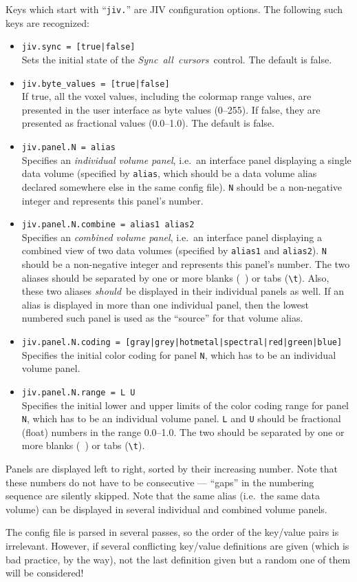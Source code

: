 Keys which start with ``\verb+jiv.+'' are JIV configuration
options. The following such keys are recognized:
\begin{itemize}
\item \verb+jiv.sync = [true|false]+ \\
  Sets the initial state of the \mbox{\em Sync all cursors}\ control.
  The default is false.
\item \verb+jiv.byte_values = [true|false]+ \\
  If true, all the voxel values, including the colormap range values,
  are presented in the user interface as byte values (0--255). If
  false, they are presented as fractional values (0.0--1.0). The
  default is false.
\item \verb+jiv.panel.N = alias+ \\
  Specifies an {\em individual volume panel}, i.e.\ an interface panel
  displaying a single data volume (specified by \verb+alias+, which
  should be a data volume alias declared somewhere else in the same
  config file).  \verb+N+ should be a non-negative integer and
  represents this panel's number.
\item \verb+jiv.panel.N.combine = alias1 alias2+ \\
  Specifies an {\em combined volume panel}, i.e.\ an interface panel
  displaying a combined view of two data volumes (specified by
  \verb+alias1+ and \verb+alias2+). \verb+N+ should be a non-negative
  integer and represents this panel's number. The two aliases should
  be separated by one or more blanks (\verb*+ +) or tabs (\verb+\t+).
  Also, these two aliases {\em should}\ be displayed in their
  individual panels as well. If an alias is displayed in more than one
  individual panel, then the lowest numbered such panel is used as the
  ``source'' for that volume alias.
\item \verb+jiv.panel.N.coding = [gray|grey|hotmetal|spectral|red|green|blue]+ \\
  Specifies the initial color coding for panel \verb+N+, which has to
  be an individual volume panel.
\item \verb+jiv.panel.N.range = L U+ \\
  Specifies the initial lower and upper limits of the color coding
  range for panel \verb+N+, which has to be an individual volume
  panel. \verb+L+ and \verb+U+ should be fractional (float) numbers in
  the range 0.0--1.0.  The two should be separated by one or more
  blanks (\verb*+ +) or tabs (\verb+\t+).
\end{itemize}
Panels are displayed left to right, sorted by their increasing number.
Note that these numbers do not have to be consecutive --- ``gaps'' in
the numbering sequence are silently skipped.  Note that the same alias
(i.e.\ the same data volume) can be displayed in several individual
and combined volume panels.

The config file is parsed in several passes, so the order of the
key/value pairs is irrelevant. However, if several conflicting
key/value definitions are given (which is bad practice, by the way),
not the last definition given but a random one of them will be
considered!


